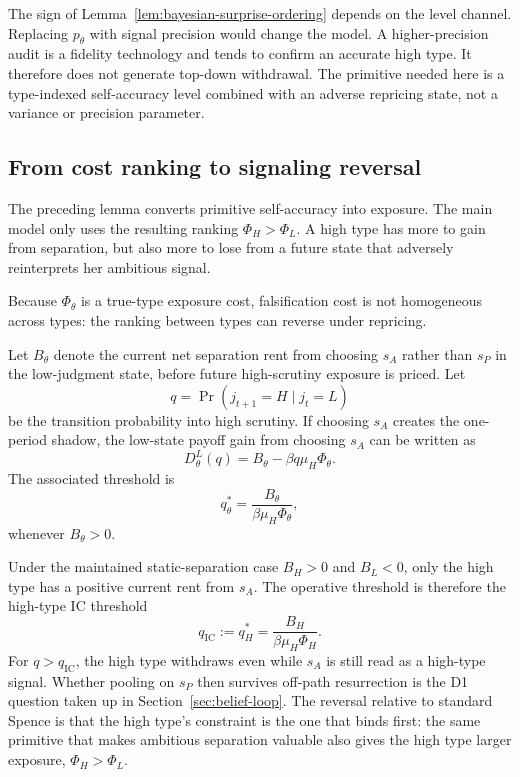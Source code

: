 \begin{remark}
The sign of Lemma~\ref{lem:bayesian-surprise-ordering} depends on the level channel. Replacing $p_\theta$ with signal precision would change the model. A higher-precision audit is a fidelity technology and tends to confirm an accurate high type. It therefore does not generate top-down withdrawal. The primitive needed here is a type-indexed self-accuracy level combined with an adverse repricing state, not a variance or precision parameter.
\end{remark}

\subsection{From cost ranking to signaling reversal}

The preceding lemma converts primitive self-accuracy into exposure. The main model only uses the resulting ranking \(\Phi_H>\Phi_L\). A high type has more to gain from separation, but also more to lose from a future state that adversely reinterprets her ambitious signal.

Because $\Phi_\theta$ is a true-type exposure cost, falsification cost is not homogeneous across types: the ranking between types can reverse under repricing.

Let $B_\theta$ denote the current net separation rent from choosing $s_A$ rather than $s_P$ in the low-judgment state, before future high-scrutiny exposure is priced. Let
\[
q=\Pr(j_{t+1}=H\mid j_t=L)
\]
be the transition probability into high scrutiny. If choosing $s_A$ creates the one-period shadow, the low-state payoff gain from choosing $s_A$ can be written as
\[
D_\theta^L(q)=B_\theta-\beta q\mu_H\Phi_\theta.
\]
The associated threshold is
\[
q_\theta^*=\frac{B_\theta}{\beta\mu_H\Phi_\theta},
\]
whenever $B_\theta>0$.

Under the maintained static-separation case \(B_H>0\) and \(B_L<0\), only the high type has a positive current rent from \(s_A\). The operative threshold is therefore the high-type IC threshold
\[
q_{\mathrm{IC}}:=q_H^*=\frac{B_H}{\beta\mu_H\Phi_H}.
\]
For \(q>q_{\mathrm{IC}}\), the high type withdraws even while \(s_A\) is still read as a high-type signal. Whether pooling on \(s_P\) then survives off-path resurrection is the D1 question taken up in Section~\ref{sec:belief-loop}. The reversal relative to standard Spence is that the high type's constraint is the one that binds first: the same primitive that makes ambitious separation valuable also gives the high type larger exposure, \(\Phi_H>\Phi_L\).
